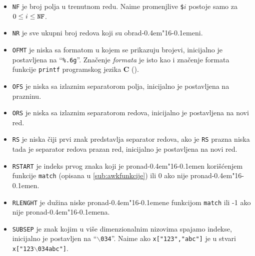 \documentclass[12pt,a4paper]{article}
\def\d{d\kern-0.4em\char"16\kern-0.1em}
\def\bs{$\backslash$}
\begin{document}
\begin{itemize}
          o velim ili malim slovima, inicijalno je 0.
        \item
          {\tt NF} je broj polja u trenutnom redu.
          Naime promenjlive {\tt\$$i$} postoje samo za
          $0\le i\le\hbox{\tt NF}$.
        \item
          {\tt NR} je sve ukupni broj redova koji su obra\d eni.
        \item
          {\tt OFMT} je niska sa formatom u kojem se prikazuju brojevi,
          inicijalno je postavljena na ``{\tt\%.6g}''.
          Zna\v cenje {\it formata} je isto kao i zna\v cenje formata funkcije
          {\tt printf} programskog jezika {\bf C} (\cite{KR,AWK}).
        \item
          {\tt OFS} je niska sa izlaznim separatorom polja, inicijalno je
          postavljena na prazninu.
        \item
          {\tt ORS} je niska sa izlaznim separatorom redova, inicijalno je
          postavljena na novi red.
        \item
          {\tt RS} je niska \v ciji prvi znak predstavlja separator redova,
          ako je {\tt RS} prazna niska tada je separator redova prazan red,
          inicijalno je postavljena na novi red.
        \item
          {\tt RSTART} je indeks prvog znaka koji je prona\d en
          kori\v s\'cenjem funkcije {\tt match} (opisana u
          \ref{sub:awkfunkcije}) ili 0 ako nije prona\d en.
        \item
          {\tt RLENGHT} je du\v zina niske prona\d ene funkcijom {\tt match}
          ili -1 ako nije prona\d ena.
        \item
          {\tt SUBSEP} je znak kojim u vi\v se dimenzionalnim nizovima spajamo
          indekse, inicijalno je postavljen na ``{\tt\bs034}''.
          Naime ako {\tt x["123","abc"]} je u stvari {\tt x["123\bs034abc"]}.
        \end{itemize}
%
\end{document}
